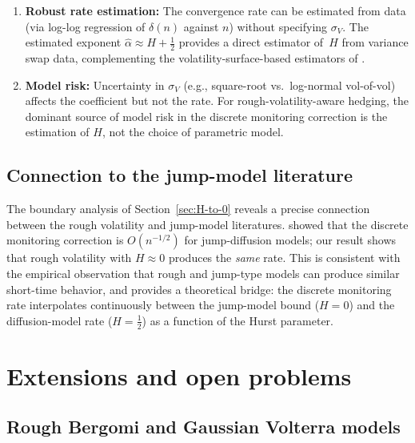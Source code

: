 \documentclass[12pt]{article}
\theoremstyle{definition}
\begin{document}
\begin{enumerate}[label=(\roman*)]
\item \textbf{Robust rate estimation:}
  The convergence rate can be estimated from data
  (via log-log regression of $\delta(n)$ against $n$) without
  specifying $\sigma_V$.
  The estimated exponent $\hat\alpha \approx H + \tfrac12$ provides
  a direct estimator of~$H$ from variance swap data,
  complementing the volatility-surface-based estimators of
  \citet{GatheralJaissonRosenbaum2018}.

\item \textbf{Model risk:}
  Uncertainty in $\sigma_V$ (e.g., square-root vs.\ log-normal
  vol-of-vol) affects the coefficient but not the rate.
  For rough-volatility-aware hedging, the dominant source of model
  risk in the discrete monitoring correction is the estimation of
  $H$, not the choice of parametric model.
\end{enumerate}

\subsection{Connection to the jump-model literature}

The boundary analysis of Section~\ref{sec:H-to-0} reveals a
precise connection between the rough volatility and jump-model
literatures.
\citet{JarrowKchiaProtte2013} showed that the discrete monitoring
correction is $O(n^{-1/2})$ for jump-diffusion models;
our result shows that rough volatility with $H \approx 0$ produces
the \emph{same} rate.
This is consistent with the empirical observation that rough and
jump-type models can produce similar short-time behavior, and provides a theoretical bridge:
the discrete monitoring rate interpolates continuously between the
jump-model bound ($H = 0$) and the diffusion-model rate ($H = \tfrac12$)
as a function of the Hurst parameter.

\section{Extensions and open problems}\label{sec:extensions}

\subsection{Rough Bergomi and Gaussian Volterra models}
\end{document}

